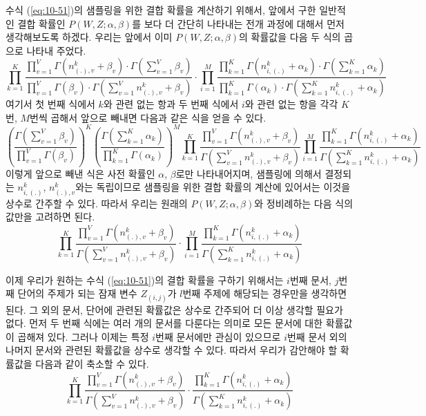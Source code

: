 \documentclass[a4paper]{oblivoir}
\begin{document}
수식 (\ref{eq:10-51})의 샘플링을 위한 결합 확률을 계산하기 위해서, 앞에서 구한 일반적인 결합 확률인 $P(W,Z ; \alpha,\beta)$를 보다 더 간단히 나타내는 전개 과정에 대해서 먼저 생각해보도록 하겠다. 우리는 앞에서 이미 $P(W,Z ; \alpha,\beta)$의 확률값을 다음 두 식의 곱으로 나타내 주었다.
\begin{equation}
\prod_{k=1}^{K} \frac{\prod_{v=1}^{V} \Gamma(n_{(.),v}^{k}+\beta_{v}) \cdot \Gamma(\sum_{v=1}^{V} \beta_{v})}{\prod_{v=1}^{V} \Gamma(\beta_{v}) \cdot \Gamma(\sum_{v=1}^{V} n_{(.),v}^{k}+\beta_{v})} \cdot \prod_{i=1}^{M} \frac{\prod_{k=1}^{K} \Gamma(n^{k}_{i,(.)}+\alpha_{k}) \cdot \Gamma(\sum_{k=1}^{K} \alpha_{k})}{\prod_{k=1}^{K} \Gamma(\alpha_{k}) \cdot \Gamma(\sum_{k=1}^{K} n^{k}_{i,(.)}+\alpha_{k})}
\label{eq:10-52}
\end{equation}
여기서 첫 번째 식에서 $k$와 관련 없는 항과 두 번째 식에서 $i$와 관련 없는 항을 각각 $K$번, $M$번씩 곱해서 앞으로 빼내면 다음과 같은 식을 얻을 수 있다.  
\begin{equation}
(\frac{\Gamma(\sum_{v=1}^{V} \beta_{v})}{\prod_{v=1}^{V} \Gamma(\beta_{v})})^{K} (\frac{\Gamma(\sum_{k=1}^{K} \alpha_{k})}{\prod_{k=1}^{K} \Gamma(\alpha_{k})})^{M} \prod_{k=1}^{K} \frac{\prod_{v=1}^{V} \Gamma(n_{(.),v}^{k}+\beta_{v})}{\Gamma(\sum_{v=1}^{V} n_{(.),v}^{k}+\beta_{v})} \prod_{i=1}^{M} \frac{\prod_{k=1}^{K} \Gamma(n^{k}_{i,(.)}+\alpha_{k})}{\Gamma(\sum_{k=1}^{K} n^{k}_{i,(.)}+\alpha_{k})}
\label{eq:10-53}
\end{equation}
이렇게 앞으로 빼낸 식은 사전 확률인 $\alpha$, $\beta$로만 나타내어지며, 샘플링에 의해서 결정되는 $n^{k}_{i,(.)}$, $n^{k}_{(.),v}$와는 독립이므로 샘플링을 위한 결합 확률의 계산에 있어서는 이것을 상수로 간주할 수 있다. 따라서 우리는 원래의 $P(W,Z ; \alpha,\beta)$와 정비례하는 다음 식의 값만을 고려하면 된다.
\begin{equation}
\prod_{k=1}^{K} \frac{\prod_{v=1}^{V} \Gamma(n_{(.),v}^{k}+\beta_{v})}{\Gamma(\sum_{v=1}^{V} n_{(.),v}^{k}+\beta_{v})} \cdot \prod_{i=1}^{M} \frac{\prod_{k=1}^{K} \Gamma(n^{k}_{i,(.)}+\alpha_{k})}{\Gamma(\sum_{k=1}^{K} n^{k}_{i,(.)}+\alpha_{k})}
\label{eq:10-54}
\end{equation}

이제 우리가 원하는 수식 (\ref{eq:10-51})의 결합 확률을 구하기 위해서는 $i$번째 문서, $j$번째 단어의 주제가 되는 잠재 변수 $Z_{(i,j)}$가 $l$번째 주제에 해당되는 경우만을 생각하면 된다. 그 외의 문서, 단어에 관련된 확률값은 상수로 간주되어 더 이상 생각할 필요가 없다. 먼저 두 번째 식에는 여러 개의 문서를 다룬다는 의미로 모든 문서에 대한 확률값이 곱해져 있다. 그러나 이제는 특정 $i$번째 문서에만 관심이 있으므로 $i$번째 문서 외의 나머지 문서와 관련된 확률값을 상수로 생각할 수 있다. 따라서 우리가 감안해야 할 확률값을 다음과 같이 축소할 수 있다.    
\begin{equation}
\prod_{k=1}^{K} \frac{\prod_{v=1}^{V} \Gamma(n_{(.),v}^{k}+\beta_{v})}{\Gamma(\sum_{v=1}^{V} n_{(.),v}^{k}+\beta_{v})} \cdot \frac{\prod_{k=1}^{K} \Gamma(n^{k}_{i,(.)}+\alpha_{k})}{\Gamma(\sum_{k=1}^{K} n^{k}_{i,(.)}+\alpha_{k})}
\label{eq:10-55}
\end{equation}
\end{document}
